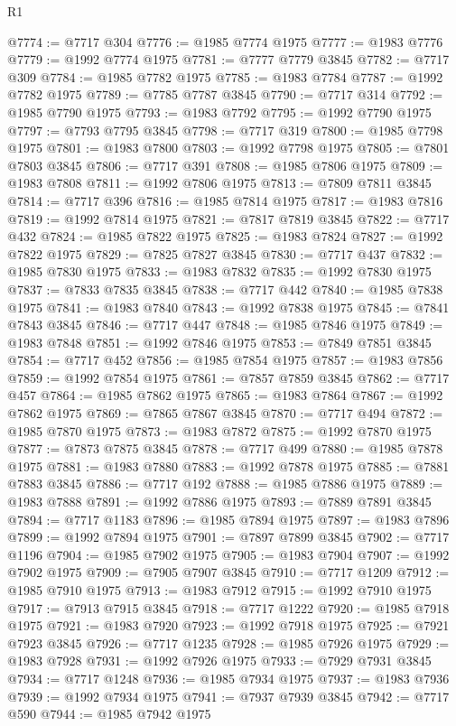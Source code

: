 \begin{lexlean}{R1}
\begin{coremodule}
@7774 := @7717 @304
@7776 := @1985 @7774 @1975
@7777 := @1983 @7776
@7779 := @1992 @7774 @1975
@7781 := @7777 @7779 @3845
@7782 := @7717 @309
@7784 := @1985 @7782 @1975
@7785 := @1983 @7784
@7787 := @1992 @7782 @1975
@7789 := @7785 @7787 @3845
@7790 := @7717 @314
@7792 := @1985 @7790 @1975
@7793 := @1983 @7792
@7795 := @1992 @7790 @1975
@7797 := @7793 @7795 @3845
@7798 := @7717 @319
@7800 := @1985 @7798 @1975
@7801 := @1983 @7800
@7803 := @1992 @7798 @1975
@7805 := @7801 @7803 @3845
@7806 := @7717 @391
@7808 := @1985 @7806 @1975
@7809 := @1983 @7808
@7811 := @1992 @7806 @1975
@7813 := @7809 @7811 @3845
@7814 := @7717 @396
@7816 := @1985 @7814 @1975
@7817 := @1983 @7816
@7819 := @1992 @7814 @1975
@7821 := @7817 @7819 @3845
@7822 := @7717 @432
@7824 := @1985 @7822 @1975
@7825 := @1983 @7824
@7827 := @1992 @7822 @1975
@7829 := @7825 @7827 @3845
@7830 := @7717 @437
@7832 := @1985 @7830 @1975
@7833 := @1983 @7832
@7835 := @1992 @7830 @1975
@7837 := @7833 @7835 @3845
@7838 := @7717 @442
@7840 := @1985 @7838 @1975
@7841 := @1983 @7840
@7843 := @1992 @7838 @1975
@7845 := @7841 @7843 @3845
@7846 := @7717 @447
@7848 := @1985 @7846 @1975
@7849 := @1983 @7848
@7851 := @1992 @7846 @1975
@7853 := @7849 @7851 @3845
@7854 := @7717 @452
@7856 := @1985 @7854 @1975
@7857 := @1983 @7856
@7859 := @1992 @7854 @1975
@7861 := @7857 @7859 @3845
@7862 := @7717 @457
@7864 := @1985 @7862 @1975
@7865 := @1983 @7864
@7867 := @1992 @7862 @1975
@7869 := @7865 @7867 @3845
@7870 := @7717 @494
@7872 := @1985 @7870 @1975
@7873 := @1983 @7872
@7875 := @1992 @7870 @1975
@7877 := @7873 @7875 @3845
@7878 := @7717 @499
@7880 := @1985 @7878 @1975
@7881 := @1983 @7880
@7883 := @1992 @7878 @1975
@7885 := @7881 @7883 @3845
@7886 := @7717 @192
@7888 := @1985 @7886 @1975
@7889 := @1983 @7888
@7891 := @1992 @7886 @1975
@7893 := @7889 @7891 @3845
@7894 := @7717 @1183
@7896 := @1985 @7894 @1975
@7897 := @1983 @7896
@7899 := @1992 @7894 @1975
@7901 := @7897 @7899 @3845
@7902 := @7717 @1196
@7904 := @1985 @7902 @1975
@7905 := @1983 @7904
@7907 := @1992 @7902 @1975
@7909 := @7905 @7907 @3845
@7910 := @7717 @1209
@7912 := @1985 @7910 @1975
@7913 := @1983 @7912
@7915 := @1992 @7910 @1975
@7917 := @7913 @7915 @3845
@7918 := @7717 @1222
@7920 := @1985 @7918 @1975
@7921 := @1983 @7920
@7923 := @1992 @7918 @1975
@7925 := @7921 @7923 @3845
@7926 := @7717 @1235
@7928 := @1985 @7926 @1975
@7929 := @1983 @7928
@7931 := @1992 @7926 @1975
@7933 := @7929 @7931 @3845
@7934 := @7717 @1248
@7936 := @1985 @7934 @1975
@7937 := @1983 @7936
@7939 := @1992 @7934 @1975
@7941 := @7937 @7939 @3845
@7942 := @7717 @590
@7944 := @1985 @7942 @1975

\end{coremodule}
\end{lexlean}
